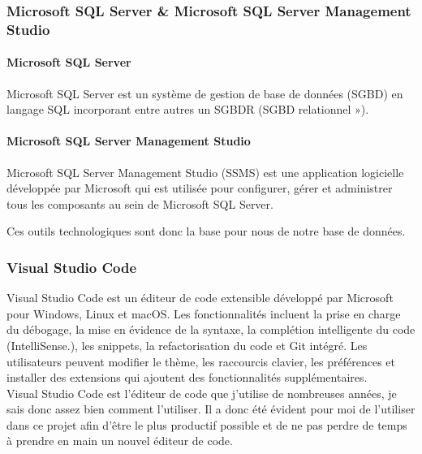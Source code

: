 \documentclass[a4paper, 12pt, french]{article}
\begin{document}
				\subsubsection{Microsoft SQL Server \& Microsoft SQL Server Management Studio}%

					\paragraph{Microsoft SQL Server\\}
						Microsoft SQL Server est un système de gestion de base de données (SGBD) en langage SQL incorporant entre autres un SGBDR (SGBD relationnel »).

					\paragraph{Microsoft SQL Server Management Studio\\}
						Microsoft SQL Server Management Studio (SSMS) est une application logicielle développée par Microsoft qui est utilisée pour configurer, gérer et administrer tous les composants au sein de Microsoft SQL Server.

					Ces outils technologiques sont donc la base pour nous de notre base de données.

				\subsubsection{Visual Studio Code}%
					Visual Studio Code est un éditeur de code extensible développé par Microsoft pour Windows, Linux et macOS. Les fonctionnalités incluent la prise en charge du débogage, la mise en évidence de la syntaxe, la complétion intelligente du code (IntelliSense.), les snippets, la refactorisation du code et Git intégré. Les utilisateurs peuvent modifier le thème, les raccourcis clavier, les préférences et installer des extensions qui ajoutent des fonctionnalités supplémentaires.\\

					Visual Studio Code est l'éditeur de code que j'utilise de nombreuses années, je sais donc assez bien comment l'utiliser. Il a donc été évident pour moi de l'utiliser dans ce projet afin d'être le plus productif possible et de ne pas perdre de temps à prendre en main un nouvel éditeur de code.
					
\end{document}
